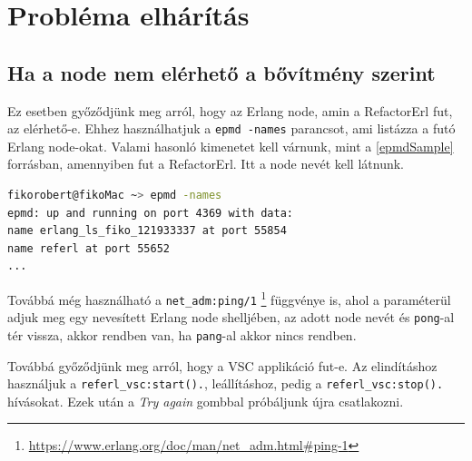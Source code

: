 \section{Probléma elhárítás}
\subsection{Ha a node nem elérhető a bővítmény szerint} \label{not_reachable_node}

Ez esetben győződjünk meg arról, hogy az Erlang node, amin a RefactorErl fut, az elérhető-e. Ehhez használhatjuk a \lstinline{epmd -names} parancsot, ami listázza a futó Erlang node-okat.
Valami hasonló kimenetet kell várnunk, mint a \ref{epmdSample} forrásban, amennyiben fut a RefactorErl. Itt a node nevét kell látnunk.

\lstset{caption=Erlang Port Mapper Deamon (epmd) példa kimenete, label=src:sh}  \label{epmdSample}
\begin{lstlisting}[language={sh}] 
fikorobert@fikoMac ~> epmd -names
epmd: up and running on port 4369 with data:
name erlang_ls_fiko_121933337 at port 55854
name referl at port 55652
...
\end{lstlisting}


Továbbá még használható a \lstinline{net_adm:ping/1} \footnote{\url{https://www.erlang.org/doc/man/net_adm.html#ping-1}} függvénye is, ahol a paraméterül adjuk meg egy nevesített Erlang node shelljében, az adott node nevét és \lstinline{pong}-al tér vissza, akkor rendben van, ha \lstinline{pang}-al akkor nincs rendben.

Továbbá győződjünk meg arról, hogy a VSC applikáció fut-e. Az elindításhoz használjuk a \lstinline{referl_vsc:start().}, leállításhoz, pedig a \lstinline{referl_vsc:stop().} hívásokat. Ezek után a \textit{Try again} gombbal próbáljunk újra csatlakozni.
